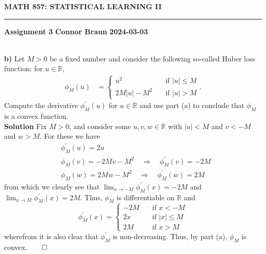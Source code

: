 \documentclass[10pt]{article}
\newcommand{\mbb}[1]{\mathbb{#1}}
\newcommand{\1}[1]{\mathbbm{1}_{#1}}
\begin{document}
    \begin{center}
        {\bf\large{MATH 857: STATISTICAL LEARNING II}}
        \smallskip
        \hrule
        \smallskip
        {\bf Assignment 3} \hfill {\bf Connor Braun} \hfill {\bf 2024-03-03}
    \end{center}
    \\[5pt]
    {\bf b)}\hspace{5pt} Let $M>0$ be a fixed number and consider the following so-called Huber loss function: for $u\in\mbb{R}$,
    \begin{align*}
        \phi_M(u)&=\begin{cases}
            u^2\quad&\text{if $|u|\leq M$}\\
            2M|u|-M^2\quad&\text{if $|u|>M$}
        \end{cases}.
    \end{align*}
    Compute the derivative $\phi^\prime_M(u)$ for $u\in\mbb{R}$ and use part (a) to conclude that $\phi_M$ is a convex function.\\[5pt]
    {\bf Solution}\hspace{5pt} Fix $M>0$, and consider some $u,v,w\in\mbb{R}$ with $|u|<M$ and $v<-M$ and $w>M$. For these we have
    \begin{align*}
        &\phi_M^\prime(u)=2u\\
        &\phi_M(v)=-2Mv-M^2\quad\Rightarrow\quad \phi^\prime_M(v)=-2M\\
        &\phi_M(w)=2Mw-M^2\quad\Rightarrow\quad\phi^\prime_M(w)=2M
    \end{align*}
    from which we clearly see that $\lim_{x\rightarrow -M}\phi^\prime_M(x)=-2M$ and $\lim_{x\rightarrow M}\phi_M^\prime(x)=2M$. Thus, $\phi_M$ is differentiable on $\mbb{R}$ and 
    \[\phi_M^\prime(x)=\begin{cases}
        -2M\quad&\text{if $x<-M$}\\
        2x\quad&\text{if $|x|\leq M$}\\
        2M\quad&\text{if $x>M$}
    \end{cases}\]
    wherefrom it is also clear that $\phi^\prime_M$ is non-decreasing. Thus, by part (a), $\phi_M$ is convex.\hfill{$\qed$}
\end{document}
